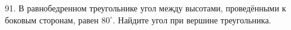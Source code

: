 91. В равнобедренном треугольнике угол между высотами, проведёнными к боковым сторонам, равен $80^\circ.$ Найдите угол при вершине треугольника.\\
